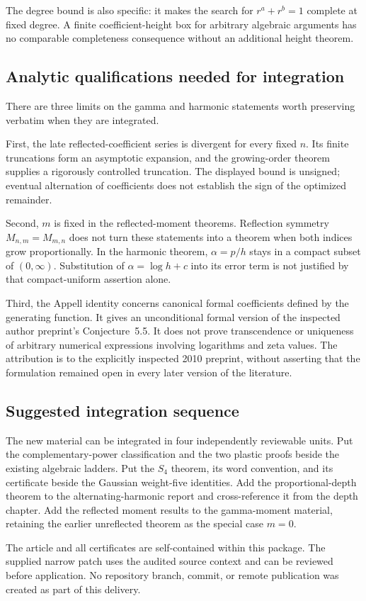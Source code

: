The degree bound is also specific: it makes the search for
$r^a+r^b=1$ complete at fixed degree. A finite coefficient-height box
for arbitrary algebraic arguments has no comparable completeness
consequence without an additional height theorem.

\subsection{Analytic qualifications needed for integration}

There are three limits on the gamma and harmonic statements worth
preserving verbatim when they are integrated.

First, the late reflected-coefficient series is divergent for every
fixed $n$. Its finite truncations form an asymptotic expansion, and
the growing-order theorem supplies a rigorously controlled truncation.
The displayed bound is unsigned; eventual alternation of coefficients
does not establish the sign of the optimized remainder.

Second, $m$ is fixed in the reflected-moment theorems. Reflection
symmetry $M_{n,m}=M_{m,n}$ does not turn these statements into a theorem
when both indices grow proportionally. In the harmonic theorem,
$\alpha=p/h$ stays in a compact subset of $(0,\infty)$. Substitution
of $\alpha=\log h+c$ into its error term is not justified by that
compact-uniform assertion alone.

Third, the Appell identity concerns canonical formal coefficients
defined by the generating function. It gives an unconditional formal
version of the inspected author preprint's Conjecture~5.5. It does
not prove transcendence or uniqueness of arbitrary numerical
expressions involving logarithms and zeta values. The attribution is
to the explicitly inspected 2010 preprint, without asserting that the
formulation remained open in every later version of the literature.

\subsection{Suggested integration sequence}

The new material can be integrated in four independently reviewable
units. Put the complementary-power classification and the two plastic
proofs beside the existing algebraic ladders. Put the $S_4$ theorem,
its word convention, and its certificate beside the Gaussian weight-five
identities. Add the proportional-depth theorem to the alternating-harmonic
report and cross-reference it from the depth chapter. Add the reflected
moment results to the gamma-moment material, retaining the earlier
unreflected theorem as the special case $m=0$.

The article and all certificates are self-contained within this package.
The supplied narrow patch uses the audited source context and can be
reviewed before application. No repository branch, commit, or remote
publication was created as part of this delivery.
